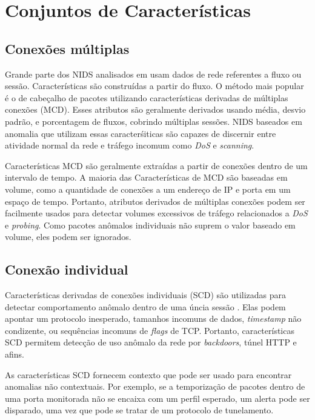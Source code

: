 
\section{Conjuntos de Características}
\subsection{Conexões múltiplas}
Grande parte dos NIDS analisados em \cite{davis11} usam dados de rede referentes a fluxo ou sessão. Características
são construídas a partir do fluxo. O método mais popular é o de cabeçalho de pacotes utilizando características
derivadas de múltiplas conexões (MCD). Esses atributos são geralmente derivados usando média, desvio padrão, e
porcentagem de fluxos, cobrindo múltiplas sessões. NIDS baseados em anomalia que utilizam essas caracterśiticas são
capazes de discernir entre atividade normal da rede e tráfego incomum como \textit{DoS} e \textit{scanning}.
\par Características MCD são geralmente extraídas a partir de conexões dentro de um intervalo de tempo. A maioria das
 Características de MCD são baseadas em volume, como a quantidade de conexões a um endereço de IP e porta
 em um espaço de tempo. Portanto, atributos derivados de múltiplas conexões podem ser facilmente usados para detectar
 volumes excessivos de tráfego relacionados a \textit{DoS} e \textit{probing}. Como pacotes anômalos individuais não
 suprem o valor baseado em volume, eles podem ser ignorados.

\subsection{Conexão individual}
Características derivadas de conexões individuais (SCD) são utilizadas para detectar comportamento anômalo dentro de
uma úncia sessão \cite{song13}. Elas podem apontar um protocolo inesperado, tamanhos incomuns de dados, \emph{timestamp} não condizente,
ou sequências incomuns de \textit{flags} de TCP. Portanto, características SCD permitem detecção de uso anômalo da rede
por \textit{backdoors}, túnel HTTP e afins.
\par As características SCD fornecem contexto que pode ser usado para encontrar anomalias não contextuais. Por exemplo, se a
temporização de pacotes dentro de uma porta monitorada não se encaixa com um perfil esperado, um alerta pode ser
disparado, uma vez que pode se tratar de um protocolo de tunelamento.

